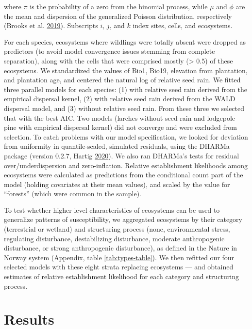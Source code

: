 \documentclass[
]{article}
\begin{document}
where \(\pi\) is the probability of a zero from the binomial process, while \(\mu\) and \(\phi\) are the mean and dispersion of the generalized Poisson distribution, respectively (Brooks et al. \protect\hyperlink{ref-brooksStatisticalModelingPatterns2019}{2019}).
Subscripts \(i\), \(j\), and \(k\) index sites, cells, and ecosystems.

For each species, ecosystems where wildlings were totally absent were dropped as predictors (to avoid model convergence issues stemming from complete separation), along with the cells that were comprised mostly (\textgreater{} 0.5) of these ecosystems.
We standardized the values of Bio1, Bio19, elevation from plantation, and plantation age, and centered the natural log of relative seed rain.
We fitted three parallel models for each species: (1) with relative seed rain derived from the empirical dispersal kernel, (2) with relative seed rain derived from the WALD dispersal model, and (3) without relative seed rain.
From these three we selected that with the best AIC.
Two models (larches without seed rain and lodgepole pine with empirical dispersal kernel) did not converge and were excluded from selection.
To catch problems with our model specification, we looked for deviation from uniformity in quantile-scaled, simulated residuals, using the DHARMa package (version 0.2.7, Hartig \protect\hyperlink{ref-hartigDHARMaResidualDiagnostics2020}{2020}).
We also ran DHARMa's tests for residual over/underdispersion and zero-inflation.
Relative establishment likelihoods among ecosystems were calculated as predictions from the conditional count part of the model (holding covariates at their mean values), and scaled by the value for ``forests'' (which were common in the sample).

To test whether higher-level characteristics of ecosystems can be used to generalize patterns of susceptibility, we aggregated ecosystems by their category (terrestrial or wetland) and structuring process (none, environmental stress, regulating disturbance, destabilizing disturbance, moderate anthropogenic disturbance, or strong anthropogenic disturbance), as defined in the Nature in Norway system (Appendix, table \ref{tab:types-table}).
We then refitted our four selected models with these eight strata replacing ecosystems --- and obtained estimates of relative establishment likelihood for each category and structuring process.

\hypertarget{results}{%
\section{Results}\label{results}}
\end{document}
